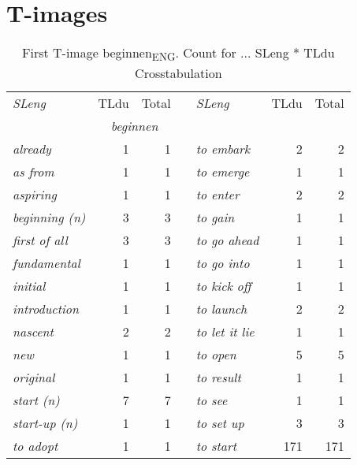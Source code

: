 \appendix
\chapter{T-images}\label{ch:A} 

\begin{table}
\caption{First T-image beginnen\textsubscript{ENG}. Count for ... SLeng * TLdu Crosstabulation}
\begin{tabularx}{\textwidth}{>{\itshape}lrrX>{\itshape}lrr}
\lsptoprule
\normalfont SLeng & TLdu & Total          &   & \normalfont  SLeng &  TLdu & Total\\\cmidrule(lr){2-3}\cmidrule(lr){6-7}
& \multicolumn{2}{c}{\itshape beginnen}  & & & \multicolumn{2}{c}{\itshape beginnen}  \\\midrule
 already &  1 &  1 & & to embark &  2 &  2\\
 as from &  1 &  1                           & & to emerge &  1 &  1\\
 aspiring &  1 &  1                          & & to enter &  2 &  2\\
 beginning (n) &  3 &  3                     & & to gain &  1 &  1\\
 first of all &  3 &  3                      & & to go ahead &  1 &  1\\
 fundamental &  1 &  1                       & & to go into &  1 &  1\\
 initial &  1 &  1                           & & to kick off &  1 &  1\\
 introduction &  1 &  1                      & & to launch &  2 &  2\\
 nascent &  2 &  2                           & & to let it lie &  1 &  1\\
 new &  1 &  1                               & & to open &  5 &  5\\
 original &  1 &  1                          & & to result &  1 &  1\\
 start (n) &  7 &  7                         & & to see &  1 &  1\\
 start-up (n) &  1 &  1                      & & to set up &  3 &  3\\
 to adopt &  1 &  1                          & & to start &  171 &  171\\

\end{tabularx}
\end{table}
